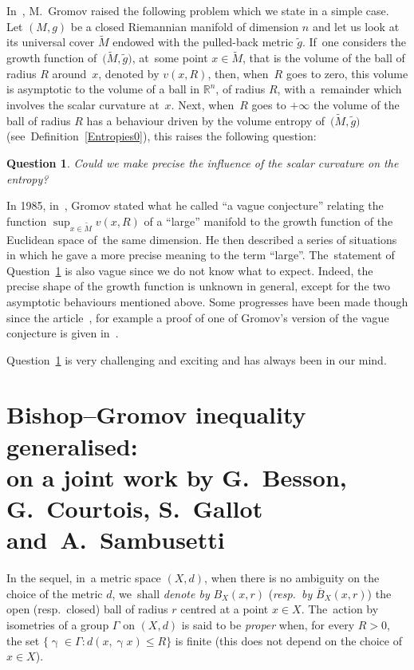 \documentclass[pdftex]{sigma}
\numberwithin{equation}{section}
\newtheorem{question}[theor]{Question}
\newcommand{\g}{\operatorname{\gamma}}
\begin{document}
In~\cite{Gro-Large}, M.~Gromov raised the following problem which we state in a simple case. Let $(M,g)$ be a closed Riemannian manifold of dimension $n$ and let us look at its universal cover $\widetilde M$ endowed with the pulled-back metric $\tilde g$. If~one considers the growth function
of~$\big(\widetilde M, \tilde g\big)$, at~some point $x\in\widetilde M$, that is the volume of the ball of radius $R$ around~$x$, denoted by $v(x,R)$, then, when~$R$ goes to zero, this volume is asymptotic to the volume of a ball in $\mathbb{R}^n$, of radius $R$, with a~remainder which involves the scalar curvature at~$x$. Next, when~$R$ goes to $+\infty$ the volume of the ball of radius $R$ has a behaviour driven by the volume entropy of~$\big(\widetilde M, \tilde g\big)$ (see~Definition~\ref{Entropies0}), this raises the following
question:
\begin{question}\label{question:scal-ent}
Could we make precise the influence of the scalar curvature on the entropy?
\end{question}
In 1985, in~\cite[p.~108]{Gro-Large}, Gromov stated what he called ``a vague conjecture'' relating the function $\sup_{x\in\widetilde M}v(x,R)$ of a ``large'' manifold to the growth function of the Euclidean space of~the same dimension. He then described a series of situations in which he gave a more precise meaning to the term ``large''. The~statement of Question~\ref{question:scal-ent} is also vague since we do not
know what to expect. Indeed, the precise shape of the growth function is unknown in general, except for the two asymptotic behaviours mentioned above. Some progresses have been made though since the article~\cite{Gro-Large}, for example a proof of one of Gromov's version of the vague conjecture is given in~\cite{Guth-large}.

Question~\ref{question:scal-ent} is very challenging and exciting and has
always been in our mind.

\section[Bishop--Gromov inequality generalised: on a joint work by G.~Besson, G.~Courtois, S.~Gallot and~A.~Sambusetti]
{Bishop--Gromov inequality generalised:\\
on a joint work by G.~Besson, G.~Courtois, S.~Gallot \\and~A.~Sambusetti}\label{chap:BG}

In the sequel, in~a metric space $(X,d)$, when there is no ambiguity on the choice of the metric $d$, we~shall \textit{denote by} $B_X (x,r)$ (\textit{resp.\ by}
$\overline B_X (x,r)$) the open (resp.\ closed) ball of radius $r$ centred at a point $x \in X$. The~action by isometries of a group $\Gamma$ on $(X,d)$ is said
to be {\em proper} when, for every $R> 0$, the set $\{ \g \in \Gamma\colon d(
x, \g x) \le R\}$ is finite (this does not depend on the choice of~$x \in X$).
\end{document}
